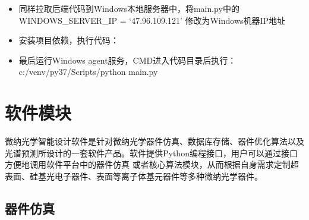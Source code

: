 \documentclass[letterpaper,10pt,english]{sphinxmanual}
\begin{document}
{{\begin{itemize}
\item {} 
\sphinxAtStartPar
同样拉取后端代码到Windows本地服务器中，将main.py中的WINDOWS\_SERVER\_IP = ‘47.96.109.121’ 修改为Windows机器IP地址

\item {} 
\sphinxAtStartPar
安装项目依赖，执行代码：

\begin{sphinxVerbatim}[commandchars=\\\{\}]
    
 
    
\end{sphinxVerbatim}

\item {} 
\sphinxAtStartPar
最后运行Windows agent服务，CMD进入代码目录后执行：c:/venv/py37/Scripts/python main.py

\end{itemize}

\sphinxstepscope


\chapter{软件模块}
\label{\detokenize{_u8f6f_u4ef6_u6a21_u5757_u4ecb_u7ecd/index:id1}}\label{\detokenize{_u8f6f_u4ef6_u6a21_u5757_u4ecb_u7ecd/index::doc}}
\sphinxAtStartPar
微纳光学智能设计软件是针对微纳光学器件仿真、数据库存储、器件优化算法以及光谱预测所设计的一套软件产品。软件提供Python编程接口，用户可以通过接口方便地调用软件平台中的器件仿真
或者核心算法模块，从而根据自身需求定制超表面、硅基光电子器件、表面等离子体基元器件等多种微纳光学器件。

\sphinxstepscope


\section{器件仿真}
\label{\detokenize{_u8f6f_u4ef6_u6a21_u5757_u4ecb_u7ecd/_u5668_u4ef6_u4eff_u771f/contents:id1}}\label{\detokenize{_u8f6f_u4ef6_u6a21_u5757_u4ecb_u7ecd/_u5668_u4ef6_u4eff_u771f/contents::doc}}

}}
\end{document}
